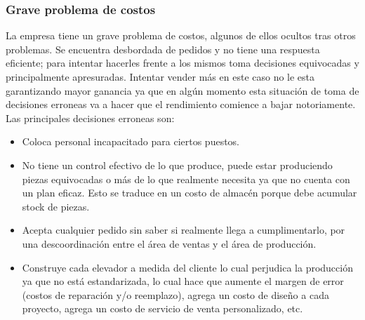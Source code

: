 \documentclass[12pt,a4paper,spanish]{article}
\begin{document}
\subsubsection{Grave problema de costos}
La empresa tiene un grave problema de costos, algunos de ellos ocultos tras otros problemas. Se encuentra desbordada de pedidos y no tiene una respuesta eficiente; para intentar hacerles frente a los mismos toma decisiones equivocadas y principalmente apresuradas. Intentar vender m\'as en este caso no le esta garantizando mayor ganancia ya que en alg\'un momento esta situaci\'on de toma de decisiones erroneas va a hacer que el rendimiento comience a bajar notoriamente. Las principales decisiones erroneas son:
	\begin{itemize}
 		\item Coloca personal incapacitado para ciertos puestos. 
		\item No tiene un control efectivo de lo que produce, puede estar produciendo piezas equivocadas o m\'as de lo que realmente necesita ya que no cuenta con un plan eficaz. Esto se traduce en un costo de almac\'en porque debe acumular stock de piezas.
		\item Acepta cualquier pedido sin saber si realmente llega a cumplimentarlo, por una descoordinaci\'on entre el \'area de ventas y el \'area de producci\'on.
		\item Construye cada elevador a medida del cliente lo cual perjudica la producci\'on ya que no est\'a estandarizada, lo cual hace que aumente el margen de error (costos de reparaci\'on y/o reemplazo), agrega un costo de dise\~no a cada proyecto, agrega un costo de servicio de venta personalizado, etc.
	\end{itemize}
\end{document}
